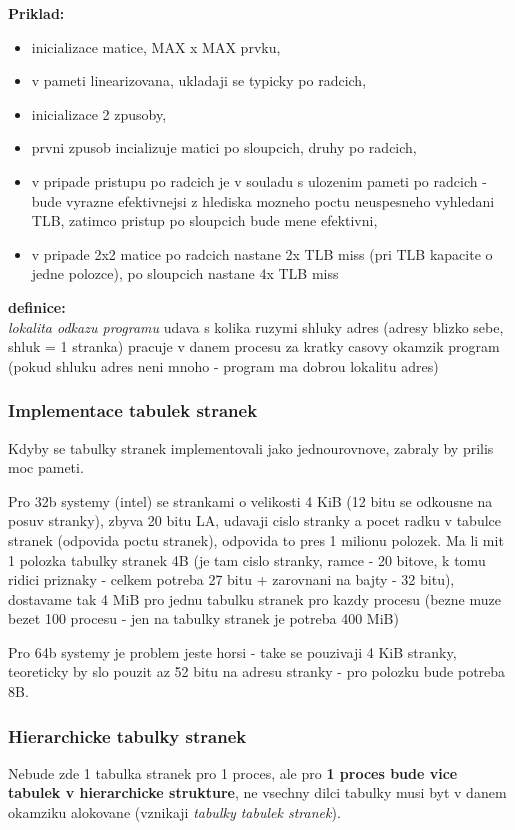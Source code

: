 \documentclass[a4paper, 11pt]{article}
\begin{document}
\textbf{Priklad:}
\begin{itemize}
    \item inicializace matice, MAX x MAX prvku,
    \item v pameti linearizovana, ukladaji se typicky po radcich,
    \item inicializace 2 zpusoby,
    \item prvni zpusob incializuje matici po sloupcich, druhy po radcich,
    \item v pripade pristupu po radcich je v souladu s ulozenim pameti po radcich - bude vyrazne efektivnejsi z hlediska mozneho poctu neuspesneho vyhledani TLB, zatimco pristup po sloupcich bude mene efektivni,
    \item v pripade 2x2 matice po radcich nastane 2x TLB miss (pri TLB kapacite o jedne polozce), po sloupcich nastane 4x TLB miss \\
\end{itemize}

\textbf{definice:} \\[0.5em]
\textit{lokalita odkazu programu} udava s kolika ruzymi shluky adres (adresy blizko sebe, shluk = 1 stranka) pracuje v danem procesu za kratky casovy okamzik program (pokud shluku adres neni mnoho - program ma dobrou lokalitu adres) \\

\subsubsection{Implementace tabulek stranek}
Kdyby se tabulky stranek implementovali jako jednourovnove, zabraly by prilis moc pameti. 

Pro 32b systemy (intel) se strankami o velikosti  4 KiB (12 bitu se odkousne na posuv stranky), zbyva 20 bitu LA, udavaji cislo stranky a pocet radku v tabulce stranek (odpovida poctu stranek), odpovida to pres 1 milionu polozek. Ma li mit 1 polozka tabulky stranek 4B (je tam cislo stranky, ramce - 20 bitove, k tomu ridici priznaky - celkem potreba 27 bitu + zarovnani na bajty - 32 bitu), dostavame tak 4 MiB pro jednu tabulku stranek pro kazdy procesu (bezne muze bezet 100 procesu - jen na tabulky stranek je potreba 400 MiB)

Pro 64b systemy je problem jeste horsi - take se pouzivaji 4 KiB stranky, teoreticky by slo pouzit az 52 bitu na adresu stranky - pro polozku bude potreba 8B.

\subsubsection{Hierarchicke tabulky stranek}
Nebude zde 1 tabulka stranek pro 1 proces, ale pro \textbf{1 proces bude vice tabulek v hierarchicke strukture}, ne vsechny dilci tabulky musi byt v danem okamziku alokovane (vznikaji \textit{tabulky tabulek stranek}).
\end{document}
